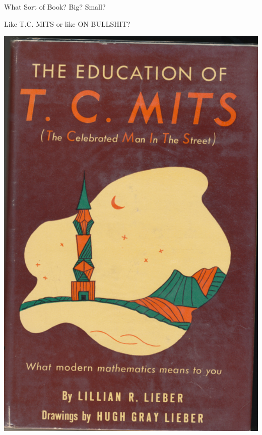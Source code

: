 \documentclass{beamer}
\begin{document}
\begin{frame}{What Sort of Book?  Big? Small?}
  \begin{center}
    Like T.\thinspace{}C. MITS or like ON BULLSHIT?
    \vspace{1ex}

    \includegraphics[height=.75\textheight]{pics/tc-mits}
    \hspace{2em}

\end{center}
\end{frame}
\end{document}

